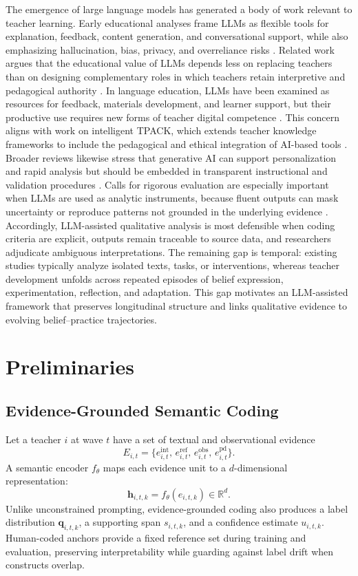 \documentclass[pdflatex,sn-mathphys-num]{sn-jnl}%
\theoremstyle{thmstyleone}%
\theoremstyle{thmstyletwo}%
\theoremstyle{thmstylethree}%
\begin{document}
The emergence of large language models has generated a body of work relevant to teacher learning. Early educational analyses frame LLMs as flexible tools for explanation, feedback, content generation, and conversational support, while also emphasizing hallucination, bias, privacy, and overreliance risks \cite{kasneci2023chatgpt,tlili2023chatgpt,lo2023impact}. Related work argues that the educational value of LLMs depends less on replacing teachers than on designing complementary roles in which teachers retain interpretive and pedagogical authority \cite{jeon2023llm,trust2023teachereducation}. In language education, LLMs have been examined as resources for feedback, materials development, and learner support, but their productive use requires new forms of teacher digital competence \cite{kohnke2023chatgpt}. This concern aligns with work on intelligent TPACK, which extends teacher knowledge frameworks to include the pedagogical and ethical integration of AI-based tools \cite{celik2023itpack}. Broader reviews likewise stress that generative AI can support personalization and rapid analysis but should be embedded in transparent instructional and validation procedures \cite{grassini2023future,farrokhnia2024swot}. Calls for rigorous evaluation are especially important when LLMs are used as analytic instruments, because fluent outputs can mask uncertainty or reproduce patterns not grounded in the underlying evidence \cite{vandis2023priorities}. Accordingly, LLM-assisted qualitative analysis is most defensible when coding criteria are explicit, outputs remain traceable to source data, and researchers adjudicate ambiguous interpretations. The remaining gap is temporal: existing studies typically analyze isolated texts, tasks, or interventions, whereas teacher development unfolds across repeated episodes of belief expression, experimentation, reflection, and adaptation. This gap motivates an LLM-assisted framework that preserves longitudinal structure and links qualitative evidence to evolving belief--practice trajectories.

\section{Preliminaries}

\subsection{Evidence-Grounded Semantic Coding}

Let a teacher $i$ at wave $t$ have a set of textual and observational evidence
\[
E_{i,t}=\{e^{\mathrm{int}}_{i,t},\,e^{\mathrm{ref}}_{i,t},\,e^{\mathrm{obs}}_{i,t},\,e^{\mathrm{pd}}_{i,t}\}.
\]
A semantic encoder $f_{\theta}$ maps each evidence unit to a $d$-dimensional representation:
\[
\mathbf{h}_{i,t,k}=f_{\theta}(e_{i,t,k})\in\mathbb{R}^{d}.
\]
Unlike unconstrained prompting, evidence-grounded coding also produces a label distribution $\mathbf{q}_{i,t,k}$, a supporting span $s_{i,t,k}$, and a confidence estimate $u_{i,t,k}$. Human-coded anchors provide a fixed reference set during training and evaluation, preserving interpretability while guarding against label drift when constructs overlap.
\end{document}
